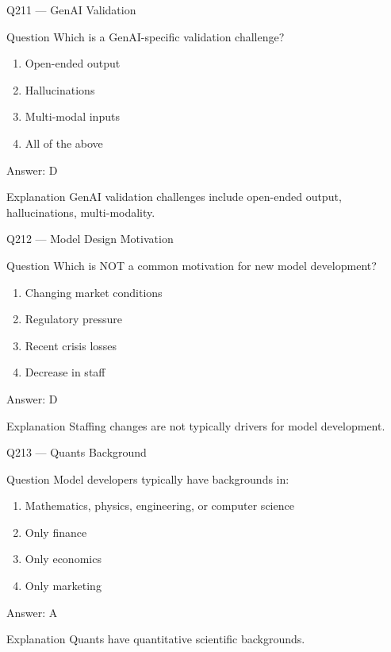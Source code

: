 \documentclass[aspectratio=169,8pt]{beamer}
\begin{document}
\begin{frame}{Q211 --- GenAI Validation}
\begin{block}{Question}
Which is a GenAI-specific validation challenge?
\begin{enumerate}
\item Open-ended output
\item Hallucinations
\item Multi-modal inputs
\item All of the above
\end{enumerate}
\end{block}
\begin{exampleblock}{Answer: D}\end{exampleblock}
\begin{block}{Explanation}
GenAI validation challenges include open-ended output, hallucinations, multi-modality.
\end{block}
\end{frame}

\begin{frame}{Q212 --- Model Design Motivation}
\begin{block}{Question}
Which is NOT a common motivation for new model development?
\begin{enumerate}
\item Changing market conditions
\item Regulatory pressure
\item Recent crisis losses
\item Decrease in staff
\end{enumerate}
\end{block}
\begin{exampleblock}{Answer: D}\end{exampleblock}
\begin{block}{Explanation}
Staffing changes are not typically drivers for model development.
\end{block}
\end{frame}

\begin{frame}{Q213 --- Quants Background}
\begin{block}{Question}
Model developers typically have backgrounds in:
\begin{enumerate}
\item Mathematics, physics, engineering, or computer science
\item Only finance
\item Only economics
\item Only marketing
\end{enumerate}
\end{block}
\begin{exampleblock}{Answer: A}\end{exampleblock}
\begin{block}{Explanation}
Quants have quantitative scientific backgrounds.
\end{block}
\end{frame}
\end{document}
